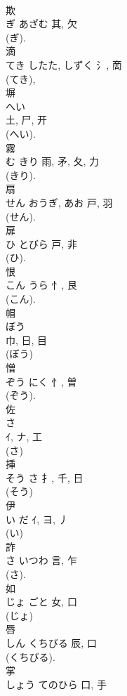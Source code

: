 \documentclass[8pt]{extreport}
\begin{document}
\begin{CJK}{UTF8}{min}
\\	欺	
\\	ぎ	あざむ	其, 欠	
\\	(ぎ).	
\\	滴	
\\	てき	したた, しずく	氵, 啇	
\\	(てき), 
\\	塀	
\\	へい	
\\	土, 尸, 开		
\\	(へい).	
\\	霧	
\\	む	きり	雨, 矛, 夂, 力	
\\	(きり). 
\\	扇	
\\	せん	おうぎ, あお	戸, 羽	
\\	(せん). 
\\	扉	
\\	ひ	とびら	戸, 非	
\\	(ひ). 
\\	恨	
\\	こん	うら	忄, 艮	
\\	(こん). 
\\	帽	
\\	ぼう	
\\	巾, 日, 目	
\\	(ぼう) 
\\	憎	
\\	ぞう	にく	忄, 曽	
\\	(ぞう).	
\\	佐	
\\	さ	
\\	ｲ, ナ, 工	
\\	(さ) 
\\	挿	
\\	そう	さ	扌, 千, 日	
\\	(そう) 
\\	伊	
\\	い	だ	ｲ, ヨ, 丿	
\\	(い) 
\\	詐	
\\	さ	いつわ	言, 乍	
\\	(さ). 
\\	如	
\\	じょ	ごと	女, 口	
\\	(じょ) 
\\	唇	
\\	しん	くちびる	辰, 口	
\\	(くちびる). 
\\	掌	
\\	しょう	てのひら	口, 手		

\end{CJK}
\end{document}
